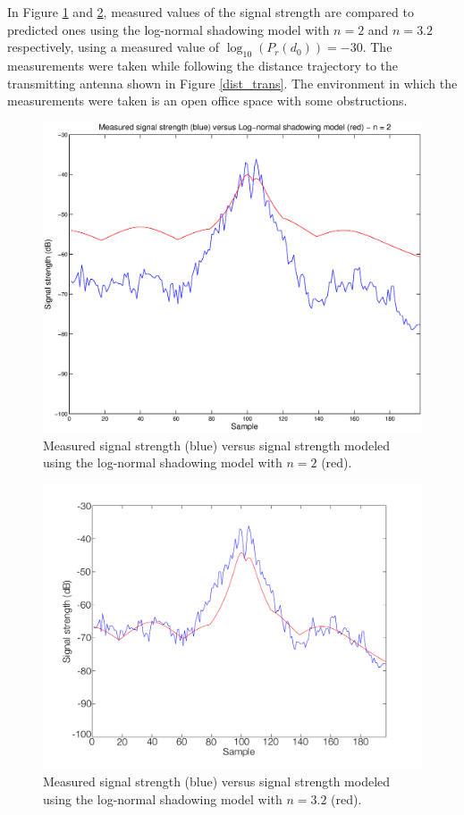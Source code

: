 \documentclass{LTHthesis}
\begin{document}
In Figure \ref{log_norm_n_2} and \ref{log_norm_n_3_2}, measured values of the signal strength are compared to predicted ones using the log-normal shadowing model with $n=2$ and $n=3.2$ respectively, using a measured value of $\log_{10}({P_r(d_0)})= -30$. The measurements were taken while following the distance trajectory to the transmitting antenna shown in Figure \ref{dist_trans}. The environment in which the measurements were taken is an open office space with some obstructions.
%
\begin{figure}[!hbt]

\includegraphics[width=1\textwidth]{images/signal_model/log_norm_n_2.eps}
\caption{Measured signal strength (blue) versus signal strength modeled using the log-normal shadowing model with $n=2$ (red).}\label{log_norm_n_2}
\end{figure}
%
\begin{figure}[!hbt]

\includegraphics[width=1\textwidth ]{images/signal_model/log_norm_n_3_2}
\caption{Measured signal strength (blue) versus signal strength modeled using the log-normal shadowing model with $n=3.2$ (red).}\label{log_norm_n_3_2}
\end{figure}
\end{document}
